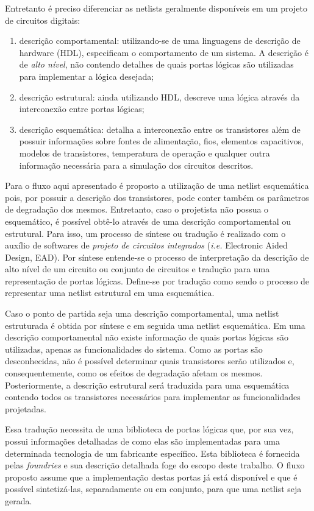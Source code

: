 Entretanto é preciso diferenciar as netlists geralmente disponíveis em um projeto de circuitos digitais:
\begin{enumerate}
	\item descrição comportamental: utilizando-se de uma linguagens de descrição de hardware (HDL), especificam o comportamento de um sistema. A descrição é de \textit{alto nível}, não contendo detalhes de quais portas lógicas são utilizadas para implementar a lógica desejada;
	\item descrição estrutural: ainda utilizando HDL, descreve uma lógica através da interconexão entre portas lógicas;
	\item descrição esquemática: detalha a interconexão entre os transistores além de possuir informações sobre fontes de alimentação, fios, elementos capacitivos, modelos de transistores, temperatura de operação e qualquer outra informação necessária para a simulação dos circuitos descritos.
\end{enumerate}

Para o fluxo aqui apresentado é proposto a utilização de uma netlist esquemática pois, por possuir a descrição dos transistores, pode conter também os parâmetros de degradação dos mesmos. Entretanto, caso o projetista não possua o esquemático, é possível obtê-lo através de uma descrição comportamental ou estrutural. Para isso, um processo de síntese ou tradução é realizado com o auxílio de softwares de \textit{projeto de circuitos integrados} (\textit{i.e.} Electronic Aided Design, EAD). Por síntese entende-se o processo de interpretação da descrição de alto nível de um circuito ou conjunto de circuitos e tradução para uma representação de portas lógicas. Define-se por tradução como sendo o processo de representar uma netlist estrutural em uma esquemática.

Caso o ponto de partida seja uma descrição comportamental, uma netlist estruturada é obtida por síntese e em seguida uma netlist esquemática. Em uma descrição comportamental não existe informação de quais portas lógicas são utilizadas, apenas as funcionalidades do sistema. Como as portas são desconhecidas, não é possível determinar quais transistores serão utilizados e, consequentemente, como os efeitos de degradação afetam os mesmos. Posteriormente, a descrição estrutural será traduzida para uma esquemática contendo todos os transistores necessários para implementar as funcionalidades projetadas.
 
Essa tradução necessita de uma biblioteca de portas lógicas que, por sua vez, possui informações detalhadas de como elas são implementadas para uma determinada tecnologia de um fabricante específico. Esta biblioteca é fornecida pelas \textit{foundries} e sua descrição detalhada foge do escopo deste trabalho. O fluxo proposto assume que a implementação destas portas já está disponível e que é possível sintetizá-las, separadamente ou em conjunto, para que uma netlist seja gerada.

